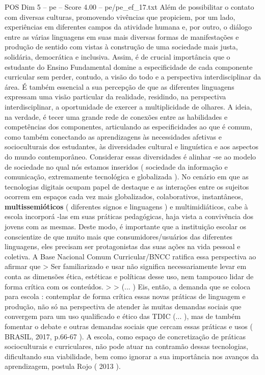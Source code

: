 \begin{textsample}{POS Dim 5 – pe – Score 4.00 – pe/pe\_ef\_17.txt}
Além de possibilitar o contato com diversas culturas, promovendo vivências que propiciem, por um lado, experiências em diferentes campos da atividade humana e, por outro, o diálogo entre as várias linguagens em suas mais diversas formas de manifestações e produção de sentido com vistas à construção de uma sociedade mais justa, solidária, democrática e inclusiva.
Assim, é de crucial importância que o estudante do Ensino Fundamental domine a especificidade de cada componente curricular sem perder, contudo, a visão do todo e a perspectiva interdisciplinar da área.
É também essencial a sua percepção de que as diferentes linguagens expressam uma visão particular da realidade, residindo, na perspectiva interdisciplinar, a oportunidade de exercer a multiplicidade de olhares.
A ideia, na verdade, é tecer uma grande rede de conexões entre as habilidades e competências dos componentes, articulando as especificidades ao que é comum, como também conectando as aprendizagens às necessidades afetivas e socioculturais dos estudantes, às diversidades cultural e linguística e aos aspectos do mundo contemporâneo.
Considerar essas diversidades é alinhar -se ao modelo de sociedade no qual nós estamos inseridos ( sociedade da informação e comunicação, extremamente tecnológica e globalizada ).
No cenário em que as tecnologias digitais ocupam papel de destaque e as interações entre os sujeitos ocorrem em espaços cada vez mais globalizados, colaborativos, instantâneos, \textbf{multissemióticos} ( diferentes signos e linguagens ) e multimidiáticos, cabe à escola incorporá -las em suas práticas pedagógicas, haja vista a convivência dos jovens com as mesmas.
Deste modo, é importante que a instituição escolar os conscientize de que muito mais que consumidores/usuários das diferentes linguagens, eles precisam ser protagonistas das suas ações na vida pessoal e coletiva.
A Base Nacional Comum Curricular/BNCC ratifica essa perspectiva ao afirmar que > Ser familiarizado e usar não significa necessariamente levar em conta as dimensões ética, estéticas e políticas desse uso, nem tampouco lidar de forma crítica com os conteúdos. > > (... ) Eis, então, a demanda que se coloca para escola : contemplar de forma crítica essas novas práticas de linguagem e produção, não só na perspectiva de atender às muitas demandas sociais que convergem para um uso qualificado e ético das TDIC (... ), mas de também fomentar o debate e outras demandas sociais que cercam essas práticas e usos ( BRASIL, 2017, p.66-67 ).
A escola, como espaço de concretização de práticas socioculturais e curriculares, não pode atuar na contramão dessas tecnologias, dificultando sua viabilidade, bem como ignorar a sua importância nos avanços da aprendizagem, postula Rojo ( 2013 ).

\end{textsample}
